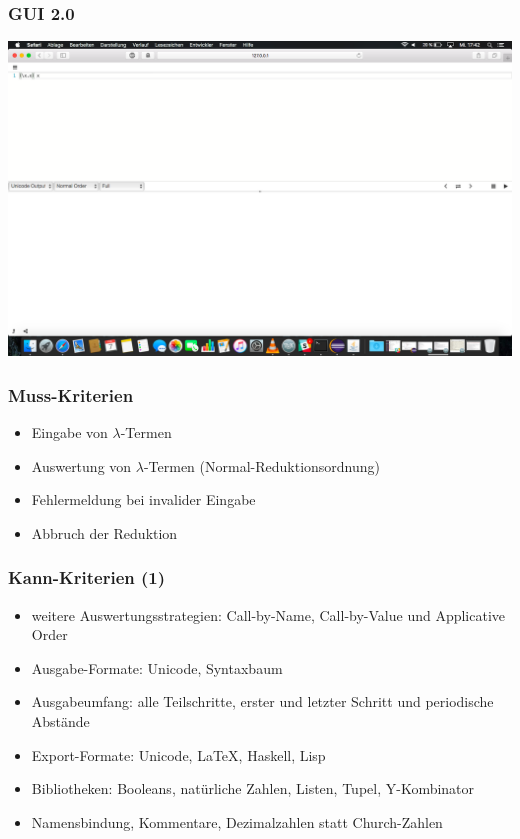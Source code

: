 \documentclass[10pt]{beamer}
\begin{document}
\begin{frame}[plain]
\frametitle{GUI 2.0}
\hspace*{-1cm}
\includegraphics[trim={0, 2.2cm, 0, 0}, clip, scale=0.25]{img/GUI2.png}
\end{frame}

\begin{frame}
\frametitle{Muss-Kriterien}
\begin{itemize}
\item Eingabe von $\lambda$-Termen
\item Auswertung von $\lambda$-Termen (Normal-Reduktionsordnung)
\item Fehlermeldung bei invalider Eingabe
\item Abbruch der Reduktion
\end{itemize}
\end{frame}

\begin{frame}
\frametitle{Kann-Kriterien (1)}
\begin{itemize}
\item weitere Auswertungsstrategien: Call-by-Name, Call-by-Value und Applicative Order
\item Ausgabe-Formate: Unicode, Syntaxbaum
\item Ausgabeumfang: alle Teilschritte, erster und letzter Schritt und periodische Abstände
\item Export-Formate: Unicode, \LaTeX, Haskell, Lisp
\item Bibliotheken: Booleans, natürliche Zahlen, Listen, Tupel, Y-Kombinator
\item Namensbindung, Kommentare, Dezimalzahlen statt Church-Zahlen
\end{itemize}
\end{frame}
\end{document}

